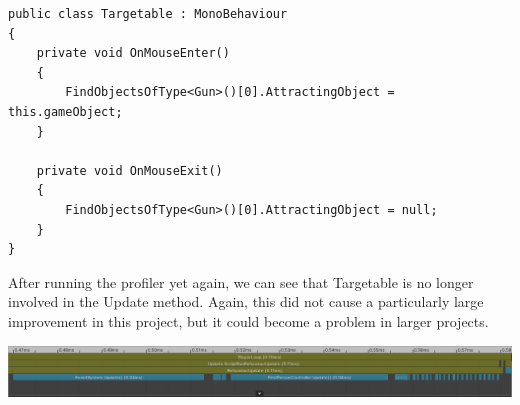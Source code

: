 \documentclass{article}
\begin{document}
\begin{lstlisting}[language={[Sharp]C}, label={Script}]
public class Targetable : MonoBehaviour
{
    private void OnMouseEnter()
    {
        FindObjectsOfType<Gun>()[0].AttractingObject = this.gameObject;
    }

    private void OnMouseExit()
    {
        FindObjectsOfType<Gun>()[0].AttractingObject = null;
    }
}
\end{lstlisting}

After running the profiler yet again, we can see that Targetable is no longer involved in the Update method. Again, this did not cause a particularly large improvement in this project, but it could become a problem in larger projects.

\begin{center}
    \includegraphics[width=\textwidth]{Images/TargetableFixed.png}
\end{center}
\end{document}
